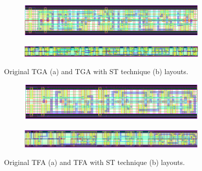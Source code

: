 \documentclass[ecp,tc, english]{iiufrgs}
\begin{document}
\begin{figure}[!htbp]
\centering
\begin{subfigure}[b]{\textwidth}
   \includegraphics[width=1\linewidth]{TGA.png}
   \caption{}
   \label{fig:Ng1} 
\end{subfigure}

\begin{subfigure}[b]{\textwidth}
   \includegraphics[width=1\linewidth]{TGAST.png}
   \caption{}
   \label{fig:Ng2}
\end{subfigure}

\caption{Original TGA (a) and TGA with ST technique (b) layouts.}
\label{TGA}
\end{figure}

\begin{figure}[H]
\centering
\begin{subfigure}[b]{\textwidth}
   \includegraphics[width=1\linewidth]{TFA.png}
   \caption{}
   \label{fig:Ng1} 
\end{subfigure}

\begin{subfigure}[b]{\textwidth}
   \includegraphics[width=1\linewidth]{TFAST.png}
   \caption{}
   \label{fig:Ng2}
\end{subfigure}

\caption{Original TFA (a) and TFA with ST technique (b) layouts.}
\label{TFA}
\end{figure}
\end{document}
